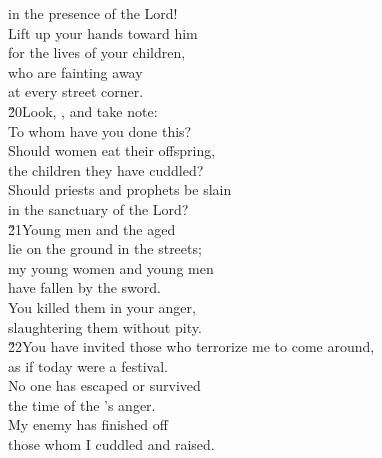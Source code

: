 \begin{poetry}
\poemll    in the presence of the Lord! \\
\poeml Lift up your hands toward him \\
\poemll    for the lives of your children, \\
\poeml who are fainting away \\
\poemll    at every street corner. \\
\poeml \v{20}Look, , and take note: \\
\poemll    To whom have you done this? \\
\poeml Should women eat their offspring, \\
\poemll    the children they have cuddled? \\
\poeml Should priests and prophets be slain \\
\poemll    in the sanctuary of the Lord? \\
\poeml \v{21}Young men and the aged \\
\poemll    lie on the ground in the streets; \\
\poeml my young women and young men \\
\poemll    have fallen by the sword. \\
\poeml You killed them in your anger, \\
\poemll    slaughtering them without pity. \\
\poeml \v{22}You have invited those who terrorize me to come around, \\
\poemll    as if today were a festival. \\
\poeml No one has escaped or survived \\
\poemll    the time of the 's anger. \\
\poeml My enemy has finished off \\
\poemll    those whom I cuddled and raised.
\end{poetry}

